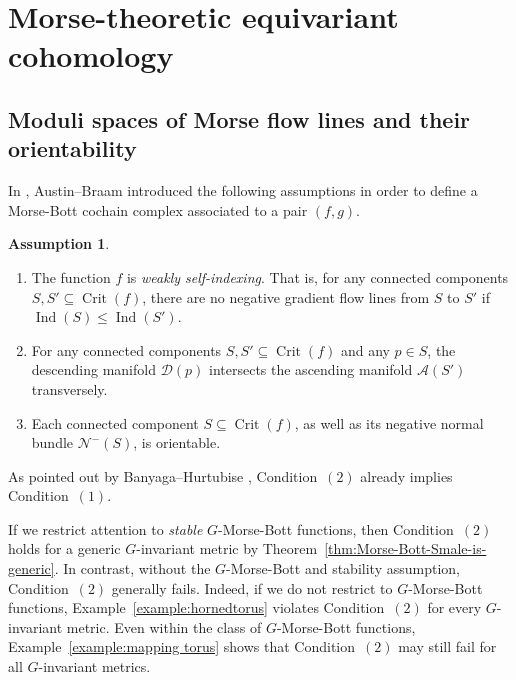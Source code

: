 \documentclass[11pt]{amsart}
\theoremstyle{definition}
\newtheorem{assumption}[theorem]{Assumption}
\numberwithin{equation}{subsection}
\DeclareMathOperator{\ind}{Ind}
\DeclareMathOperator{\crit}{Crit}
\newcommand{\des}{\mathscr{D}}
\newcommand{\asc}{\mathscr{A}}
\begin{document}

\section{Morse-theoretic equivariant cohomology}\label{section:cohomology}
\subsection{Moduli spaces of Morse flow lines and their orientability}

In \cite[Section~3.2]{AustinBraam}, Austin--Braam introduced the following assumptions in order to define a Morse-Bott cochain complex associated to a pair $(f,g)$.

\begin{assumption}\label{assump:AB}
\hfill
\begin{enumerate}
    \item The function $f$ is \emph{weakly self-indexing}. That is, for any connected components $S,S'\subseteq\crit(f)$, there are no negative gradient flow lines from $S$ to $S'$ if $\ind(S)\le \ind(S')$.
    \item For any connected components $S,S'\subseteq\crit(f)$ and any $p\in S$, the descending manifold $\des(p)$ intersects the ascending manifold $\asc(S')$ transversely.
    \item Each connected component $S\subseteq\crit(f)$, as well as its negative normal bundle $\mathcal{N}^-(S)$, is orientable.
\end{enumerate}
\end{assumption}

As pointed out by Banyaga--Hurtubise \cite[Lemma~3.6]{BanyagaHurtubise}, Condition~$(2)$ already implies Condition~$(1)$.

If we restrict attention to \emph{stable} $G$-Morse-Bott functions, then Condition~$(2)$ holds for a generic $G$-invariant metric by Theorem~\ref{thm:Morse-Bott-Smale-is-generic}.
In contrast, without the $G$-Morse-Bott and stability assumption, Condition~$(2)$ generally fails.
Indeed, if we do not restrict to $G$-Morse-Bott functions, Example~\ref{example:hornedtorus} violates Condition~$(2)$ for every $G$-invariant metric.
Even within the class of $G$-Morse-Bott functions, Example~\ref{example:mapping torus} shows that Condition~$(2)$ may still fail for all $G$-invariant metrics.
\end{document}
